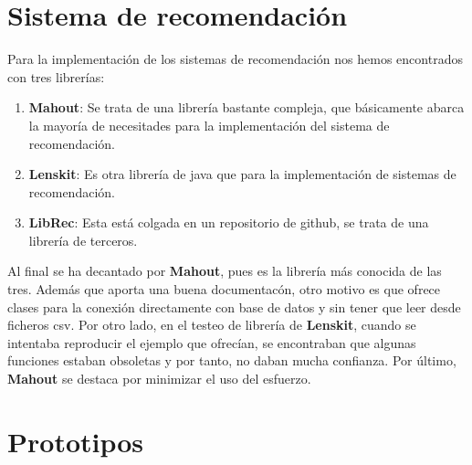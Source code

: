 \section{Sistema de recomendación}
\label{makereference3.5}
Para la implementación de los sistemas de recomendación nos hemos encontrados con tres librerías:
\begin{enumerate}
    \item \textbf{Mahout}: Se trata de una librería bastante compleja, que básicamente abarca la mayoría de necesitades para la implementación del sistema de recomendación.
    \item \textbf{Lenskit}: Es otra librería de java que para la implementación de sistemas de recomendación.
    \item \textbf{LibRec}: Esta está colgada en un repositorio de github, se trata de una librería de terceros.
\end{enumerate}

Al final se ha decantado por \textbf{Mahout}, pues es la librería más conocida de las tres. Además que aporta una buena documentacón, otro motivo es que ofrece clases para la conexión directamente con base de datos y sin tener que leer desde ficheros csv. Por otro lado, en el testeo de librería de \textbf{Lenskit}, cuando se intentaba reproducir el ejemplo que ofrecían, se encontraban que algunas funciones estaban obsoletas y por tanto, no daban mucha confianza. Por último, \textbf{Mahout} se destaca por minimizar el uso del esfuerzo.

\section{Prototipos}
\label{makereference3.6}

